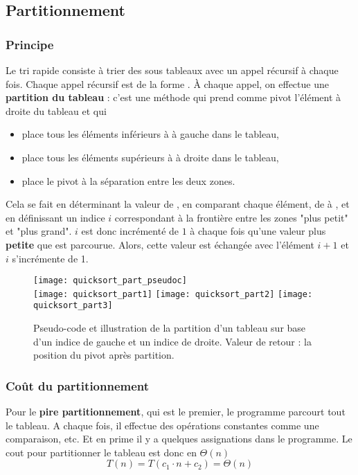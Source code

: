 \documentclass[12pt,a4paper]{book}
\newcommand{\pseudo}[1]{\rouge{\textsc{#1}}}
\begin{document}
\subsection{Partitionnement}
\subsubsection{Principe}
Le tri rapide consiste à trier des sous tableaux avec un appel récursif à chaque fois. Chaque appel récursif est de la forme \pseudo{Quicksort(A, Left, Right)}. À chaque appel, on effectue une \textbf{partition du tableau} : c'est une méthode qui prend comme pivot l'élément à droite du tableau et qui 
\begin{itemize}
\item place tous les éléments inférieurs à \pseudo{A[Right]} à gauche dans le tableau,
\item place tous les éléments supérieurs à \pseudo{A[Right]} à droite dans le tableau,
\item place le pivot à la séparation entre les deux zones.
\end{itemize}
Cela se fait en déterminant la valeur de \pseudo{A[Right]}, en comparant chaque élément, de \pseudo{A[Left]} à \pseudo{A[Right-1]}, et en définissant un indice $i$ correspondant à la frontière entre les zones "plus petit" et "plus grand". $i$ est donc incrémenté de $1$ à chaque fois qu'une valeur plus \textbf{petite} que \pseudo{A[Right]} est parcourue. Alors, cette valeur est échangée avec l'élément $i+1$ et $i$ s'incrémente de 1.
\begin{figure}[h]
\centering
\texttt{[image: quicksort\_part\_pseudoc]} \\
\texttt{[image: quicksort\_part1]} \texttt{[image: quicksort\_part2]} \texttt{[image: quicksort\_part3]}
\caption{Pseudo-code et illustration de la partition d'un tableau sur base d'un indice de gauche et un indice de droite. Valeur de retour : la position du pivot après partition.}
\label{fig:quicksort_part}
\end{figure}
\subsubsection{Coût du partitionnement}
Pour le \textbf{pire partitionnement}, qui est le premier, le programme parcourt tout le tableau. A chaque fois, il effectue des opérations constantes comme une comparaison, etc. Et en prime il y a quelques assignations dans le programme. Le cout pour partitionner le tableau est donc en $\Theta(n)$
$$T(n) = T(c_1\cdot n + c_2) = \Theta(n)$$
\end{document}
